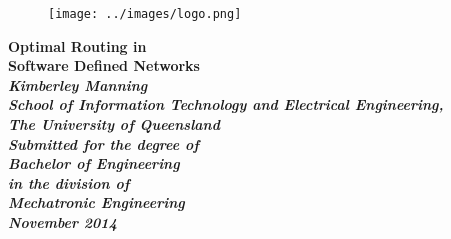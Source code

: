 \begin{titlepage}
\renewcommand{\baselinestretch}{1.0}
\begin{figure}[h]
\centering
\texttt{[image: ../images/logo.png]}
\end{figure}
\begin{center}
\vspace*{35mm}
\Huge\bf
        Optimal Routing in \\
				Software Defined Networks \\
\vspace{20mm}
\large\sl
        Kimberley Manning
                \bigskip\\
\rm
                School of Information Technology and Electrical Engineering,\\
                The University of Queensland\\
\vspace{30mm}   
                Submitted for the degree of\\
                Bachelor of Engineering
                \smallskip\\
\normalsize
                in the division of\\
                Mechatronic Engineering
                \medskip\\
\large
                November 2014
\end{center}
\end{titlepage}

\pagestyle{fancy}
\fancyfoot{}
\fancyhead{}
\renewcommand{\headrulewidth}{0pt}
\fancyfoot[C] {\footnotesize \thepage}

\cleardoublepage

